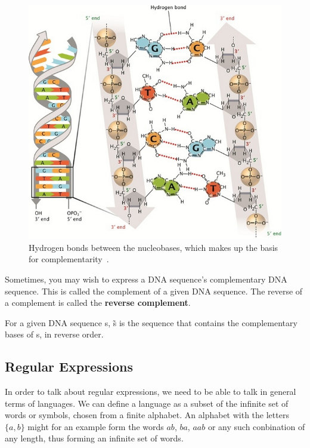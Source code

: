 \documentclass[12pt]{article}
\theoremstyle{definition}
\begin{document}
\begin{figure}[H]
	\label{Complementarity}
	\begin{center}
		\includegraphics[scale=2.5]{complementarity.jpg}	
	\end{center}
	\caption{Hydrogen bonds between the nucleobases, which makes up the basis for complementarity~\cite{DNA-nature}.}
\end{figure}

Sometimes, you may wish to express a DNA sequence's complementary DNA sequence. This is called the complement of a given DNA sequence. The reverse of a complement is called the \textbf{reverse complement}.

\begin{definition}
For a given DNA sequence s, \~{s} is the sequence that contains the complementary bases of s, in reverse order.
\end{definition}

\newpage

\subsection{Regular Expressions}

In order to talk about regular expressions, we need to be able to talk in general terms of languages. We can define a language as a subset of the infinite set of words or symbols, chosen from a finite alphabet. An alphabet with the letters $\{a,b\}$ might for an example form the words $ab$, $ba$, $aab$ or any such conbination of any length, thus forming an infinite set of words.\\
\end{document}
